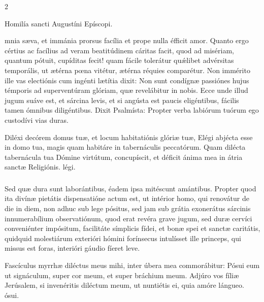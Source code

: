 \documentclass[9pt,twoside]{extarticle}
\begin{document}
\begin{multicols}{2}
\begin{center}Homilía sancti Augustíni Epíscopi.\\
\end{center}
mnia sæva, et immánia prorsus facília et prope nulla éfficit amor. Quanto ergo cértius ac facílius ad veram beatitúdinem cáritas facit, quod ad misériam, quantum pótuit, cupíditas fecit! quam fácile tolerátur quǽlibet advérsitas temporális, ut ætérna pœna vitétur, ætérna réquies comparétur. Non immérito ille vas electiónis cum ingénti lætítia dixit: Non sunt condígnæ passiónes hujus témporis ad superventúram glóriam, quæ revelábitur in nobis. Ecce unde illud jugum suáve est, et sárcina levis, et si angústa est paucis eligéntibus, fácilis tamen ómnibus diligéntibus. Dixit Psalmísta: Propter verba labiórum tuórum ego custodívi vias duras.

\begin{tightlist}{}
\item {} Diléxi decórem domus tuæ, et locum habitatiónis glóriæ tuæ, \textred{*} Elégi abjécta esse in domo tua, magis quam habitáre in tabernáculis peccatórum.  Quam dilécta tabernácula tua Dómine virtútum, concupíscit, et déficit ánima mea in átria sanctæ Religiónis. légi.
\end{tightlist}

\subsubsection*{\center {}}
Sed quæ dura sunt laborántibus, éadem ipsa mitéscunt amántibus. Propter quod ita divínæ pietátis dispensatióne actum est, ut intérior homo, qui renovátur de die in diem, non adhuc sub lege pósitus, sed jam sub grátia exonerátus sárcinis innumerabílium observatiónum, quod erat revéra grave jugum, sed duræ cervíci conveniénter impósitum, facilitáte símplicis fídei, et bonæ spei et sanctæ caritátis, quidquid molestiárum exterióri hómini forínsecus intulísset ille princeps, qui missus est foras, interióri gáudio fíeret leve.

\begin{tightlist}{}
\item {} Fascículus myrrhæ diléctus meus mihi, inter úbera mea commorábitur: \textred{*} Pósui eum ut signáculum, super cor meum, et super bráchium meum.  Adjúro vos fíliæ Jerúsalem, si invenéritis diléctum meum, ut nuntiétis ei, quia amóre lángueo. ósui.
\end{tightlist}


\end{multicols}
\end{document}
